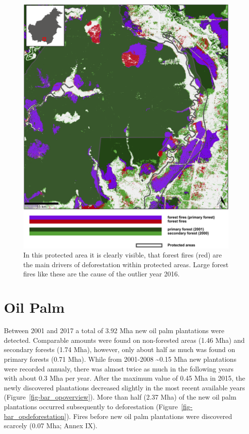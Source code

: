 \documentclass[
  letterpaper,
  DIV=11,
  numbers=noendperiod]{scrreprt}
\begin{document}
\newpage

\begin{figure}[H]

{\centering \includegraphics{text/../code/results/maps/deforestation_protected_areas_forest_fires.png}

}

\caption{\label{fig-mapforestfires}In this protected area it is clearly
visible, that forest fires (red) are the main drivers of deforestation
within protected areas. Large forest fires like these are the cause of
the outlier year 2016.}

\end{figure}

\hypertarget{oil-palm-1}{%
\section{Oil Palm}\label{oil-palm-1}}

Between 2001 and 2017 a total of 3.92 Mha new oil palm plantations were
detected. Comparable amounts were found on non-forested areas (1.46 Mha)
and secondary forests (1.74 Mha), however, only about half as much was
found on primary forests (0.71 Mha). While from 2001-2008
\textasciitilde0.15 Mha new plantations were recorded annualy, there was
almost twice as much in the following years with about 0.3 Mha per year.
After the maximum value of 0.45 Mha in 2015, the newly discovered
plantations decreased slightly in the most recent available years
(Figure~\ref{fig-bar_opoverview}). More than half (2.37 Mha) of the new
oil palm plantations occurred subsequently to deforestation
(Figure~\ref{fig-bar_opdeforestation}). Fires before new oil palm
plantations were discovered scarcely (0.07 Mha; Annex IX).
\end{document}
